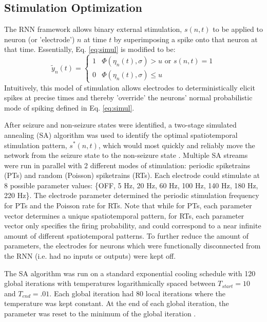 \documentclass[11pt,a4paper,final]{article}
\begin{document}
\subsection{Stimulation Optimization}
The RNN framework allows binary external stimulation, $s(n,t)$ to be applied to neuron (or 'electrode') $n$ at time $t$ by superimposing a spike onto that neuron at that time.
Essentially, Eq. \ref{eq:simul} is modified to be:
\begin{equation}
\tilde{y}_n(t) =
\begin{cases}
1   & \Phi(\eta_n(t),\sigma) > u \text{ or } s(n,t)=1 \\
0   & \Phi(\eta_n(t),\sigma) \leq u
\end{cases}
\label{eq:stim}
\end{equation}
Intuitively, this model of stimulation allows electrodes to deterministically elicit spikes at precise times and thereby 'override' the neurons' normal probabilistic mode of spiking defined in Eq. \ref{eq:simul}.

After seizure and non-seizure states were identified, a two-stage simulated annealing (SA) algorithm was used to identify the optimal spatiotemporal stimulation pattern, $s^*(n,t)$, which would most quickly and reliably move the network from the seizure state to the non-seizure state \citep{kirkpatrick83}.
Multiple SA streams were run in parallel with 2 different modes of stimulation: periodic spiketrains (PTs) and random (Poisson) spiketrains (RTs).
Each electrode could stimulate at 8 possible parameter values: \{OFF, 5 Hz, 20 Hz, 60 Hz, 100 Hz, 140 Hz, 180 Hz, 220 Hz\}.
The electrode parameter determined the periodic stimulation frequency for PTs and the Poisson rate for RTs.
Note that while for PTs, each parameter vector determines a unique spatiotemporal pattern, for RTs, each parameter vector only specifies the firing probability, and could correspond to a near infinite amount of different spatiotemporal patterns.
To further reduce the amount of parameters, the electrodes for neurons which were functionally disconnected from the RNN (i.e. had no inputs or outputs) were kept off.

The SA algorithm was run on a standard exponential cooling schedule with 120 global iterations with temperatures logarithmically spaced between $T_{start}=10$ and $T_{end}=.01$.
Each global iteration had 80 local iterations where the temperature was kept constant.
At the end of each global iteration, the parameter was reset to the minimum of the global iteration \citep{henderson03}.
\end{document}
